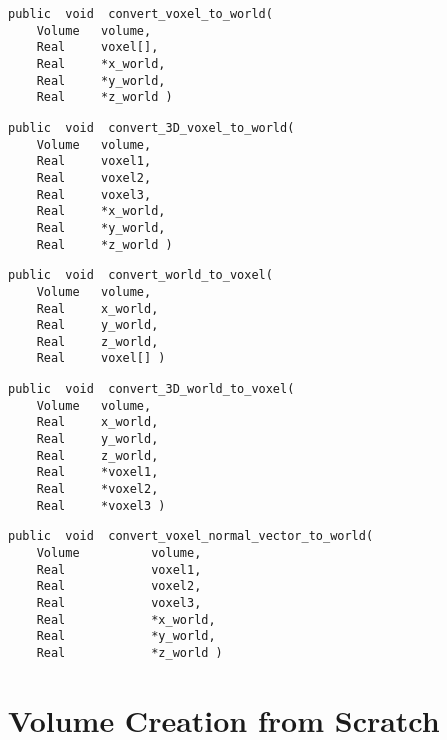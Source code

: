 {\bf\begin{verbatim}
public  void  convert_voxel_to_world(
    Volume   volume,
    Real     voxel[],
    Real     *x_world,
    Real     *y_world,
    Real     *z_world )
\end{verbatim}}


{\bf\begin{verbatim}
public  void  convert_3D_voxel_to_world(
    Volume   volume,
    Real     voxel1,
    Real     voxel2,
    Real     voxel3,
    Real     *x_world,
    Real     *y_world,
    Real     *z_world )
\end{verbatim}}


{\bf\begin{verbatim}
public  void  convert_world_to_voxel(
    Volume   volume,
    Real     x_world,
    Real     y_world,
    Real     z_world,
    Real     voxel[] )
\end{verbatim}}


{\bf\begin{verbatim}
public  void  convert_3D_world_to_voxel(
    Volume   volume,
    Real     x_world,
    Real     y_world,
    Real     z_world,
    Real     *voxel1,
    Real     *voxel2,
    Real     *voxel3 )
\end{verbatim}}


{\bf\begin{verbatim}
public  void  convert_voxel_normal_vector_to_world(
    Volume          volume,
    Real            voxel1,
    Real            voxel2,
    Real            voxel3,
    Real            *x_world,
    Real            *y_world,
    Real            *z_world )
\end{verbatim}}


\section{Volume Creation from Scratch}


